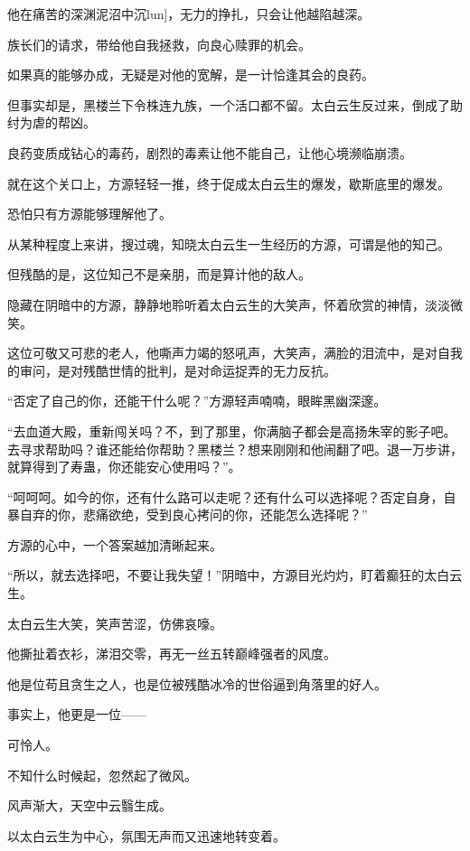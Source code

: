 \begin{this_body}
他在痛苦的深渊泥沼中沉lun]，无力的挣扎，只会让他越陷越深。

族长们的请求，带给他自我拯救，向良心赎罪的机会。

如果真的能够办成，无疑是对他的宽解，是一计恰逢其会的良药。

但事实却是，黑楼兰下令株连九族，一个活口都不留。太白云生反过来，倒成了助纣为虐的帮凶。

良药变质成钻心的毒药，剧烈的毒素让他不能自己，让他心境濒临崩溃。

就在这个关口上，方源轻轻一推，终于促成太白云生的爆发，歇斯底里的爆发。

恐怕只有方源能够理解他了。

从某种程度上来讲，搜过魂，知晓太白云生一生经历的方源，可谓是他的知己。

但残酷的是，这位知己不是亲朋，而是算计他的敌人。

隐藏在阴暗中的方源，静静地聆听着太白云生的大笑声，怀着欣赏的神情，淡淡微笑。

这位可敬又可悲的老人，他嘶声力竭的怒吼声，大笑声，满脸的泪流中，是对自我的审问，是对残酷世情的批判，是对命运捉弄的无力反抗。

“否定了自己的你，还能干什么呢？”方源轻声喃喃，眼眸黑幽深邃。

“去血道大殿，重新闯关吗？不，到了那里，你满脑子都会是高扬朱宰的影子吧。去寻求帮助吗？谁还能给你帮助？黑楼兰？想来刚刚和他闹翻了吧。退一万步讲，就算得到了寿蛊，你还能安心使用吗？”。

“呵呵呵。如今的你，还有什么路可以走呢？还有什么可以选择呢？否定自身，自暴自弃的你，悲痛欲绝，受到良心拷问的你，还能怎么选择呢？”

方源的心中，一个答案越加清晰起来。

“所以，就去选择吧，不要让我失望！”阴暗中，方源目光灼灼，盯着癫狂的太白云生。

太白云生大笑，笑声苦涩，仿佛哀嚎。

他撕扯着衣衫，涕泪交零，再无一丝五转巅峰强者的风度。

他是位苟且贪生之人，也是位被残酷冰冷的世俗逼到角落里的好人。

事实上，他更是一位——

可怜人。

不知什么时候起，忽然起了微风。

风声渐大，天空中云翳生成。

以太白云生为中心，氛围无声而又迅速地转变着。


\end{this_body}
